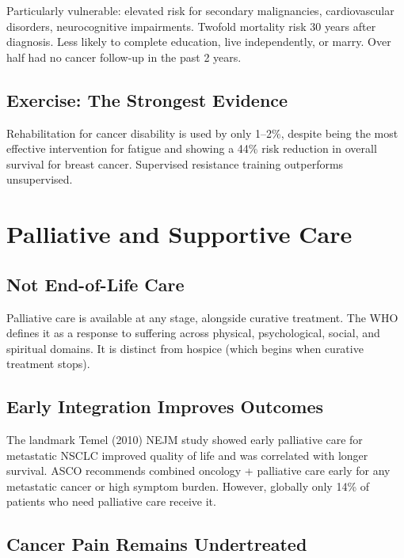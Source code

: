 Particularly vulnerable: elevated risk for secondary malignancies,
cardiovascular disorders, neurocognitive impairments. Twofold mortality
risk 30 years after diagnosis. Less likely to complete education, live
independently, or marry. Over half had no cancer follow-up in the past 2
years.

\subsection{Exercise: The Strongest
Evidence}\label{exercise-the-strongest-evidence}

Rehabilitation for cancer disability is used by only 1--2\%, despite
being the most effective intervention for fatigue and showing a 44\%
risk reduction in overall survival for breast cancer. Supervised
resistance training outperforms unsupervised.

\newpage

\section{Palliative and Supportive
Care}\label{palliative-and-supportive-care}

\subsection{Not End-of-Life Care}\label{not-end-of-life-care}

Palliative care is available at any stage, alongside curative treatment.
The WHO defines it as a response to suffering across physical,
psychological, social, and spiritual domains. It is distinct from
hospice (which begins when curative treatment stops).

\subsection{Early Integration Improves
Outcomes}\label{early-integration-improves-outcomes}

The landmark Temel (2010) NEJM study showed early palliative care for
metastatic NSCLC improved quality of life and was correlated with longer
survival. ASCO recommends combined oncology + palliative care early for
any metastatic cancer or high symptom burden. However, globally only
14\% of patients who need palliative care receive it.

\subsection{Cancer Pain Remains
Undertreated}\label{cancer-pain-remains-undertreated}

